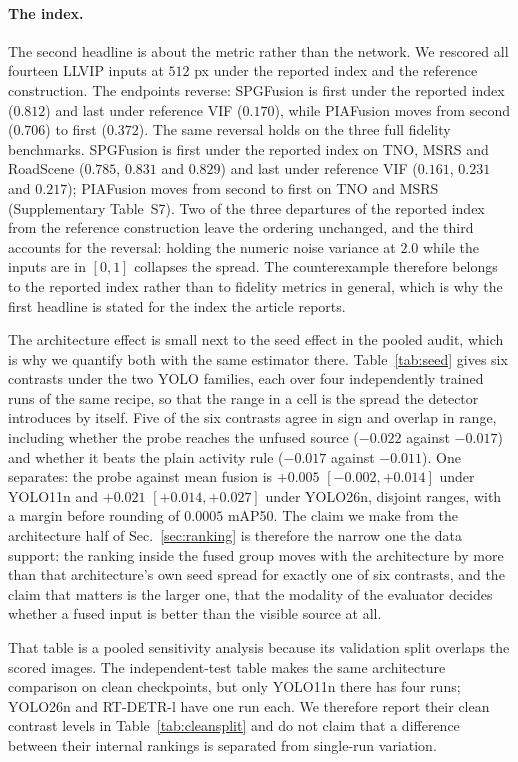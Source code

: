 \documentclass[10pt,a4paper]{article}
\begin{document}
\begin{sloppypar}
\paragraph{The index.} The second headline is about the metric rather than the network.
We rescored all fourteen LLVIP inputs at $512$ px under the reported index and the
reference construction. The endpoints reverse: SPGFusion is first under the reported
index ($0.812$) and last under reference VIF ($0.170$), while PIAFusion moves from second
($0.706$) to first ($0.372$). The same reversal holds on the three full fidelity
benchmarks. SPGFusion is first under the reported index on TNO, MSRS and RoadScene
($0.785$, $0.831$ and $0.829$) and last under reference VIF
($0.161$, $0.231$ and $0.217$); PIAFusion moves from second to first on TNO and MSRS
(Supplementary Table~S7).
Two of the three departures of the reported index from the reference construction leave
the ordering unchanged, and the third accounts for the reversal: holding the numeric
noise variance at $2.0$ while the inputs are in $[0,1]$ collapses the spread. The
counterexample therefore belongs to the reported index rather than to fidelity metrics in
general, which is why the first headline is stated for the index the article reports.

The architecture effect is small next to the seed effect in the pooled audit, which is
why we quantify both with the same estimator there. Table~\ref{tab:seed} gives six
contrasts under the two YOLO
families, each over four independently trained runs of the same recipe, so that the
range in a cell is the spread the detector introduces by itself. Five of the six
contrasts agree in sign and overlap in range, including whether the probe reaches the
unfused source ($-0.022$ against $-0.017$) and whether it beats the plain activity rule
($-0.017$ against $-0.011$). One separates: the probe against mean fusion is $+0.005$
$[-0.002,+0.014]$ under YOLO11n and $+0.021$ $[+0.014,+0.027]$ under YOLO26n, disjoint
ranges, with a margin before rounding of $0.0005$ mAP50. The claim we make from the
architecture half of Sec.~\ref{sec:ranking} is therefore the narrow one the data
support: the ranking inside the fused group moves with the architecture by more than
that architecture's own seed spread for exactly one of six contrasts, and the claim
that matters is the larger one, that the modality of the evaluator decides whether a
fused input is better than the visible source at all.

That table is a pooled sensitivity analysis because its validation split overlaps the
scored images. The independent-test table makes the same architecture comparison on
clean checkpoints, but only YOLO11n there has four runs; YOLO26n and RT-DETR-l have one
run each. We therefore report their clean contrast levels in
Table~\ref{tab:cleansplit} and do not claim that a difference between their internal
rankings is separated from single-run variation.


\end{sloppypar}
\end{document}
